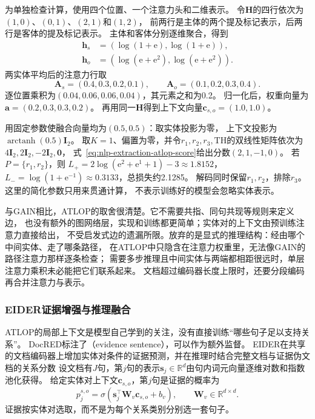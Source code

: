 \begin{example}[从局部上下文到多关系输出]
\label{ex:nlp-extraction-atlop}
为单独检查计算，使用四个位置、一个注意力头和二维表示。
令$\bm{H}$的四行依次为$(1,0)$、$(0,1)$、$(2,1)$和$(1,2)$，
前两行是主体的两个提及标记表示，后两行是客体的提及标记表示。
主体和客体分别逐维聚合，得到
\[
  \begin{aligned}
    \bm{h}_s&=(\log(1+\mathrm{e}),\log(1+\mathrm{e})),\\
    \bm{h}_o&=(\log(\mathrm{e}+\mathrm{e}^{2}),
                \log(\mathrm{e}+\mathrm{e}^{2})).
  \end{aligned}
\]
两实体平均后的注意力行取
\[
  \bm{A}_s=(0.4,0.3,0.2,0.1),\qquad
  \bm{A}_o=(0.1,0.2,0.3,0.4).
\]
逐位置乘积为$(0.04,0.06,0.06,0.04)$，其元素之和为0.2。
归一化后，权重向量为$\bm{a}=(0.2,0.3,0.3,0.2)$。
再用同一$\bm{H}$得到上下文向量$\bm{c}_{s,o}=(1.0,1.0)$。

用固定参数使融合向量均为$(0.5,0.5)$：取实体投影为零，
上下文投影为$\operatorname{arctanh}(0.5)\bm{I}_2$。
取$K=1$、偏置为零，并令$r_1,r_2,r_3,\mathrm{TH}$的双线性矩阵依次为
$4\bm{I}_2,2\bm{I}_2,-2\bm{I}_2,\bm{0}$，
式~\eqref{eq:nlp-extraction-atlop-score}给出分数$(2,1,-1,0)$。
若$P=\{r_1,r_2\}$，则
$L_+=2\log(\mathrm{e}^{2}+\mathrm{e}^{1}+1)-3\approx1.8152$，
$L_-=\log(1+\mathrm{e}^{-1})\approx0.3133$，总损失约2.1285。
解码同时保留$r_1,r_2$，排除$r_3$。这里的简化参数只用来贯通计算，
不表示训练好的模型会忽略实体表示。
\end{example}

与GAIN相比，ATLOP的取舍很清楚。它不需要共指、同句共现等规则来定义边，
也没有额外的图网络层，实现和训练都更简单；实体对的上下文由预训练注意力直接给出，
不受启发式边的遗漏所限。放弃的是显式的推理结构：经由哪个中间实体、走了哪条路径，
在ATLOP中只隐含在注意力权重里，无法像GAIN的路径注意力那样逐条检查；
需要多步推理且中间实体与两端都相距很远时，单层注意力乘积未必能把它们联系起来。
文档超过编码器长度上限时，还要分段编码再合并注意力与表示。

\subsubsection{EIDER证据增强与推理融合}
\label{sec:nlp-extraction-eider}

ATLOP的局部上下文是模型自己学到的关注，没有直接训练“哪些句子足以支持关系”。
DocRED标注了（evidence sentence），可以作为额外监督。
EIDER在共享的文档编码器上增加实体对条件的证据预测，并在推理时结合完整文档与证据伪文档的关系分数
设文档有$J$句，第$j$句的表示$\bm{s}_j\in\mathbb{R}^{d}$由句内词元向量逐维对数和指数池化获得。
给定实体对上下文$\bm{c}_{s,o}$，第$j$句是证据的概率为
\begin{equation}
  p_j^{s,o}=\sigma(\bm{s}_j^\top\bm{W}_v\bm{c}_{s,o}+b_v),
  \qquad \bm{W}_v\in\mathbb{R}^{d\times d}.
  \label{eq:nlp-extraction-eider-evidence}
\end{equation}
证据按实体对选取，而不是为每个关系类别分别选一套句子。

